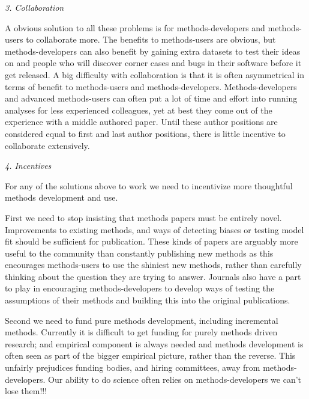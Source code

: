 \documentclass[a4paper,12pt]{article}
\renewcommand{\subsection}[1]{
  \bigskip
  \begin{center}
  \begin{large}
  \normalfont\itshape #1
  \end{large}
  \end{center}
}
\begin{document}
\subsection{3. Collaboration}
A obvious solution to all these problems is for methods-developers and methods-users to collaborate more. 
The benefits to methods-users are obvious, but methods-developers can also benefit by gaining extra datasets to test their ideas on and people who will discover corner cases and bugs in their software before it get released. 
A big difficulty with collaboration is that it is often asymmetrical in terms of benefit to methods-users and methods-developers. 
Methods-developers and advanced methods-users can often put a lot of time and effort into running analyses for less experienced colleagues, yet at best they come out of the experience with a middle authored paper. 
Until these author positions are considered equal to first and last author positions, there is little incentive to collaborate extensively.

\subsection{4. Incentives}

For any of the solutions above to work we need to incentivize more thoughtful methods development and use.

First we need to stop insisting that methods papers must be entirely novel. Improvements to existing methods, and ways of detecting biases or testing model fit should be sufficient for publication. These kinds of papers are arguably more useful to the community than constantly publishing new methods as this encourages methods-users to use the shiniest new methods, rather than carefully thinking about the question they are trying to answer. Journals also have a part to play in encouraging methods-developers to develop ways of testing the assumptions of their methods and building this into the original publications.

Second we need to fund pure methods development, including incremental methods. Currently it is difficult to get funding for purely methods driven research; and empirical component is always needed and methods development is often seen as part of the bigger empirical picture, rather than the reverse. This unfairly prejudices funding bodies, and hiring committees, away from methods-developers. Our ability to do science often relies on methods-developers we can't lose them!!!
\end{document}
